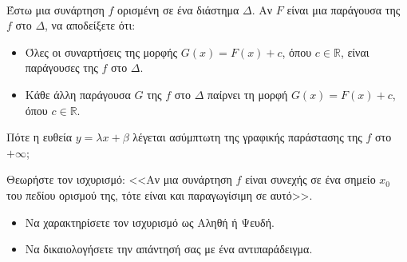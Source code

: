 \documentclass[11pt,a4paper,modern,B]{FFExam}
\begin{document}
\begin{thema}
\item\mbox{}\\
\begin{erwthma}
\item Έστω μια συνάρτηση $f$ ορισμένη σε ένα διάστημα $\Delta$. Αν $F$ είναι μια παράγουσα της $f$ στο $\Delta$, να αποδείξετε ότι:
\begin{itemize}
    \item Όλες οι συναρτήσεις της μορφής $G(x) = F(x) + c$, όπου $c \in \mathbb{R}$, είναι παράγουσες της $f$ στο $\Delta$.
    \item Κάθε άλλη παράγουσα $G$ της $f$ στο $\Delta$ παίρνει τη μορφή $G(x) = F(x) + c$, όπου $c \in \mathbb{R}$.
\end{itemize}

\item  Πότε η ευθεία $y = \lambda x + \beta$ λέγεται ασύμπτωτη της γραφικής παράστασης της $f$ στο $+\infty$;

\item  Θεωρήστε τον ισχυρισμό: <<Αν μια συνάρτηση $f$ είναι συνεχής σε ένα σημείο $x_0$ του πεδίου ορισμού της, τότε είναι και παραγωγίσιμη σε αυτό>>.
\begin{itemize}
    \item[(α)] Να χαρακτηρίσετε τον ισχυρισμό ως Αληθή ή Ψευδή.
    \item[(β)] Να δικαιολογήσετε την απάντησή σας με ένα αντιπαράδειγμα.
\end{itemize}


\end{erwthma}
\end{thema}
\end{document}
